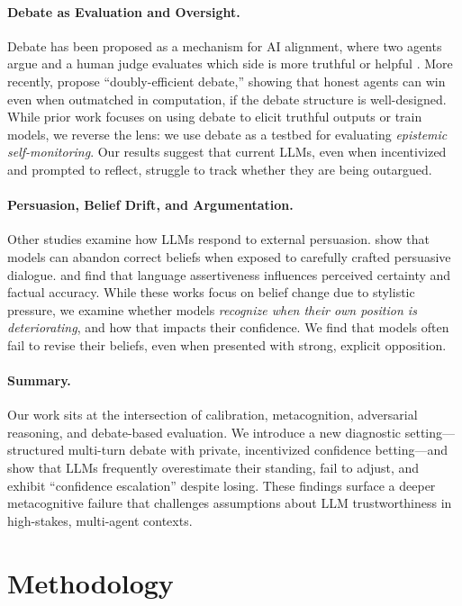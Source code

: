 \documentclass{article}
\begin{document}
\paragraph{Debate as Evaluation and Oversight.}
Debate has been proposed as a mechanism for AI alignment, where two agents argue and a human judge evaluates which side is more truthful or helpful \citep{irving2018debate}. More recently, \citet{browncohen2023debate} propose ``doubly-efficient debate,'' showing that honest agents can win even when outmatched in computation, if the debate structure is well-designed. While prior work focuses on using debate to elicit truthful outputs or train models, we reverse the lens: we use debate as a testbed for evaluating \textit{epistemic self-monitoring}. Our results suggest that current LLMs, even when incentivized and prompted to reflect, struggle to track whether they are being outargued.

\paragraph{Persuasion, Belief Drift, and Argumentation.}
Other studies examine how LLMs respond to external persuasion. \citet{xu2023earthflat} show that models can abandon correct beliefs when exposed to carefully crafted persuasive dialogue. \citet{zhou2023epistemic} and \citet{rivera2023assertive} find that language assertiveness influences perceived certainty and factual accuracy. While these works focus on belief change due to stylistic pressure, we examine whether models \textit{recognize when their own position is deteriorating}, and how that impacts their confidence. We find that models often fail to revise their beliefs, even when presented with strong, explicit opposition.

\paragraph{Summary.}
Our work sits at the intersection of calibration, metacognition, adversarial reasoning, and debate-based evaluation. We introduce a new diagnostic setting—structured multi-turn debate with private, incentivized confidence betting—and show that LLMs frequently overestimate their standing, fail to adjust, and exhibit ``confidence escalation'' despite losing. These findings surface a deeper metacognitive failure that challenges assumptions about LLM trustworthiness in high-stakes, multi-agent contexts.

\section{Methodology}
\label{sec:methodology}
\end{document}
